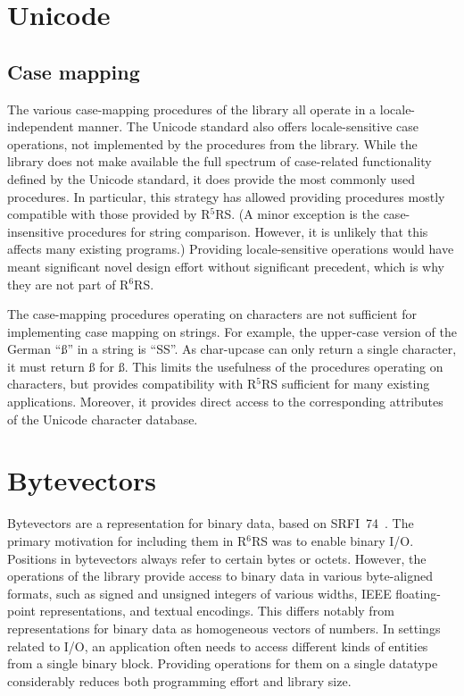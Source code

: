 \documentclass[twoside,twocolumn]{algol60}
\newcommand{\rn}[1]{R$^{#1}$RS}
\begin{document}
\chapter{Unicode}

\section{Case mapping}

The various case-mapping procedures of the 
library all operate in a locale-independent manner.  The Unicode
standard also offers locale-sensitive case operations, not implemented
by the procedures from the  library.  While the
library does not make available the full spectrum of case-related
functionality defined by the Unicode standard, it does provide the
most commonly used procedures.  In particular, this strategy has
allowed providing procedures mostly compatible with those provided by
\rn{5}.  (A minor exception is the case-insensitive procedures for
string comparison.  However, it is unlikely that this affects many
existing programs.)  Providing locale-sensitive operations would have
meant significant novel design effort without significant precedent,
which is why they are not part of \rn{6}.

The case-mapping procedures operating on characters are not sufficient
for implementing case mapping on strings.  For example, the upper-case
version of the German ``\ss{}'' in a string is ``SS''.  As {\cf
  char-upcase} can only return a single character, it must return
\ss{} for \ss.  This limits the usefulness of the procedures
operating on characters, but provides compatibility with \rn{5}
sufficient for many existing applications.  Moreover, it provides
direct access to the corresponding attributes of the Unicode character
database.

\chapter{Bytevectors}

Bytevectors are a representation for binary data, based on
SRFI~74~\cite{srfi74}.  The primary motivation for including them in
\rn{6} was to enable binary I/O.  Positions in bytevectors always
refer to certain bytes or octets.  However, the operations of the
 library provide access to binary data in
various byte-aligned formats, such as signed and unsigned integers of
various widths, IEEE floating-point representations, and textual
encodings.  This differs notably from representations for binary data
as homogeneous vectors of numbers.  In settings related to I/O, an
application often needs to access different kinds of entities from a
single binary block.  Providing operations for them on a single
datatype considerably reduces both programming effort and library
size.
\end{document}
